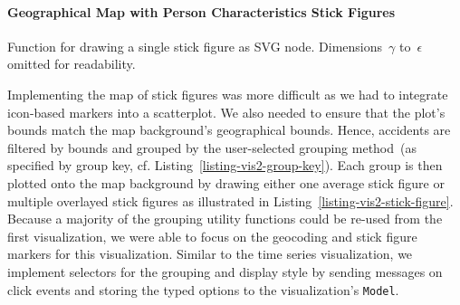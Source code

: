 \paragraph{Geographical Map with Person Characteristics Stick Figures}
\begin{listing}
    
    \caption{Mapper from the \lstinline{Accident} to its group key in preparation to grouping the accidents by grid or political region.}
    \label{listing-vis2-group-key}
\end{listing}
\begin{listing}
    
    \caption{Function for drawing a single stick figure as SVG node. Dimensions~\(\gamma\) to~\(\epsilon\) omitted for readability.}
    \label{listing-vis2-stick-figure}
\end{listing}
Implementing the map of stick figures was more difficult as we had to integrate icon-based markers into a scatterplot. We also needed to ensure that the plot's bounds match the map background's geographical bounds.
Hence, accidents are \Ni filtered by bounds and \Nii grouped by the user-selected grouping method~(as specified by group key, cf. Listing~\ref{listing-vis2-group-key}). Each group is then plotted onto the map background by drawing either one average stick figure or multiple overlayed stick figures as illustrated in Listing~\ref{listing-vis2-stick-figure}. Because a majority of the grouping utility functions could be re-used from the first visualization, we were able to focus on the geocoding and stick figure markers for this visualization. Similar to the time series visualization, we implement selectors for the grouping and display style by sending messages on click events and storing the typed options to the visualization's \lstinline{Model}.

